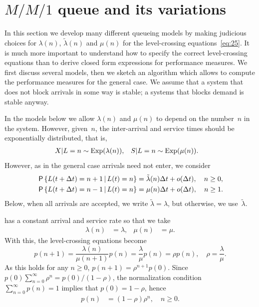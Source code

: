 \documentclass[queueing-book.tex]{subfiles}
\begin{document}
\section{\texorpdfstring{$M/M/1$}{MM1} queue and its variations}
\label{sec:mm1}


In this section we develop many different queueing models by making judicious choices for $\lambda(n)$, $\tilde \lambda(n)$ and $\mu(n)$ for the level-crossing equations~\cref{eq:25}.
It is much more important to understand how to specify the correct level-crossing equations than to derive closed form expressions for performance measures.
We first discuss several models, then we sketch an algorithm which allows to compute the performance measures for the general case.
We assume that a system that does not block arrivals in some way is stable; a systems that blocks demand is stable anyway.

In the models below we allow $\lambda(n)$ and $\mu(n)$ to depend on the number~$n$ in the system.
However, given~$n$, the inter-arrival and service times should be exponentially distributed, that is,
\begin{align*}
  X|L=n &\sim \mathrm{Exp}(\lambda(n)), & S|L=n &\sim \mathrm{Exp}(\mu(n)).
\end{align*}
However, as in the general case arrivals need not enter, we consider
\begin{align*}
  \,\mathsf{P}\left\{L(t+\Delta t) = n+1 \,\middle|\, L(t) = n \right\} &= \tilde \lambda(n) \Delta t + o(\Delta t), \quad n\geq 0,\\
  \,\mathsf{P}\left\{L(t+\Delta t) = n-1 \,\middle|\, L(t) = n \right\} &= \mu(n) \Delta t + o(\Delta t), \quad n \geq 1.
\end{align*}
Below, when all arrivals are accepted, we write $\tilde \lambda = \lambda$, but otherwise, we use~$\tilde \lambda$.


 has  a constant arrival and service rate so that we take
\begin{align*}
\lambda(n)&=\lambda, & \mu(n)&=\mu.
\end{align*}
With this, the level-crossing equations become
\begin{equation*}
 p(n+1) = \frac{\lambda(n)}{\mu(n+1)} p(n) = \frac{\lambda}{\mu} p(n) = \rho p(n),\quad \rho = \frac{\lambda}{\mu}.
\end{equation*}
As this holds for any $n\geq 0$, $p(n+1) = \rho^{n+1} p(0)$. Since $p(0) \sum_{n=0}^{\infty} \rho^{n} = p(0)/(1-\rho)$, the normalization condition $\sum_{n=0}^{\infty} p(n) = 1$ implies that $p(0) = 1-\rho$, hence
\begin{align}\label{eq:23}
p(n) &= (1-\rho)\rho^{n}, \quad n \geq 0.
\end{align}
\end{document}
